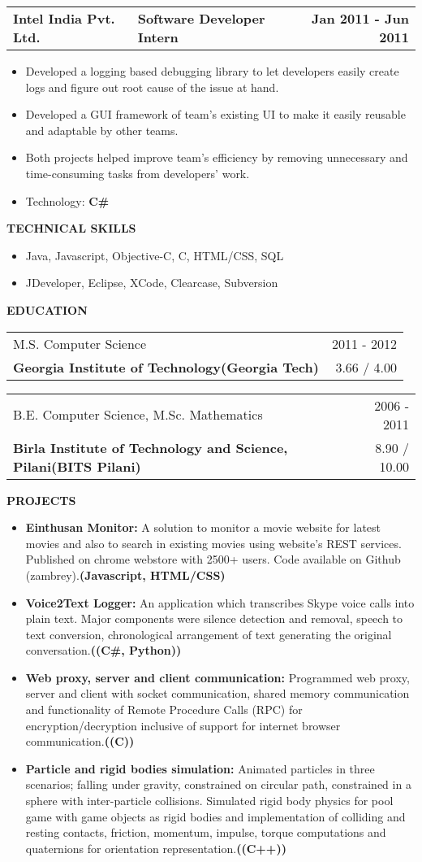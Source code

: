 \documentclass[a4paper]{article}
\makeatletter
\newcommand{\resumesection}[1]{
	\vspace*{-0.5\baselineskip}
	\begin{flushleft}
		\large{\textbf{\uppercase{#1}}}
	\end{flushleft}
} %
\newcommand{\experiencesubsection}[3]{
	\begin{tabular*}{1.0\textwidth}{@{\extracolsep{\fill}} p{7cm} l r}
		\textbf{#1} & \textbf{#2} & \textbf{#3}
	\end{tabular*}
} %
\newcommand{\educationsubsection}[4]{
	\begin{tabular*}{1.0\textwidth}{@{\extracolsep{\fill}} l r}
		#1 & #2 \\
		\textbf{#3} & #4\\
	\end{tabular*}
} %
\newcommand{\techitem}[1]{\item Technology: \textbf{#1}} %
\newcommand{\project}[3]{\item \textbf{#1:} #2\textbf{(#3)}} %
\newcommand{\customitemizespacing}{\addtolength{\itemsep}{-0.5\baselineskip}}
\makeatother
\begin{document}
\experiencesubsection{Intel India Pvt. Ltd.}{Software Developer Intern}{Jan 2011 - Jun 2011}
\begin{itemize}
	\item Developed a logging based debugging library to let developers easily create logs and figure out root cause of the issue at hand.
	\item Developed a GUI framework of team's existing UI to make it easily reusable and adaptable by other teams.
	\item Both projects helped improve team's efficiency by removing unnecessary and time-consuming tasks from developers' work.
	\techitem{C\#}
\end{itemize}


\resumesection{Technical Skills}
\begin{itemize}
	\item Java, Javascript, Objective-C, C, HTML/CSS, SQL
	\item JDeveloper, Eclipse, XCode, Clearcase, Subversion
\end{itemize}

\resumesection{Education}
\educationsubsection{M.S. Computer Science}{2011 - 2012}{Georgia Institute of Technology(Georgia Tech)}{3.66 / 4.00}
\newline
\educationsubsection{B.E. Computer Science, M.Sc. Mathematics}{2006 - 2011}{Birla Institute of Technology and Science, Pilani(BITS Pilani)}{8.90 / 10.00}

\resumesection{Projects}
\begin{itemize}
	\project{Einthusan Monitor}{A solution to monitor a movie website for latest movies and also to search in existing movies using website's REST services. Published on chrome webstore with 2500+ users. Code available on Github (zambrey).}{Javascript, HTML/CSS}
	\project{Voice2Text Logger}{An application which transcribes Skype voice calls into plain text. Major components were silence detection and removal, speech to text conversion, chronological arrangement of text generating the original conversation.}{(C\#, Python)}
	\project{Web proxy, server and client communication}{Programmed web proxy, server and client with socket communication, shared memory communication and functionality of Remote Procedure Calls (RPC) for encryption/decryption inclusive of support for internet browser communication.}{(C)}
	\project{Particle and rigid bodies simulation}{Animated particles in three scenarios; falling under gravity, constrained on circular path, constrained in a sphere with inter-particle collisions. Simulated rigid body physics for pool game with game objects as rigid bodies and implementation of colliding and resting contacts, friction, momentum, impulse, torque computations and quaternions for orientation representation.}{(C++)}
\end{itemize}
\end{document}
